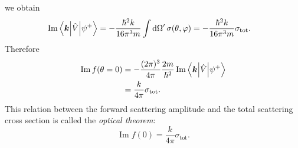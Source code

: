 we obtain
\begin{equation}\begin{aligned}
\operatorname{Im}\left\langle\bm{k}\middle|\hat{V}\middle|\psi^+\right\rangle
&=-\frac{\hbar^2k}{16\pi^3m}\int\mathrm{d}\Omega'\,\sigma(\theta,\varphi)
=-\frac{\hbar^2k}{16\pi^3m}\sigma_{\mathrm{tot}}.
\end{aligned}\end{equation}
Therefore
\begin{equation}\begin{aligned}
\operatorname{Im}f(\theta=0)
&=-\frac{(2\pi)^3}{4\pi}\frac{2m}{\hbar^2}
\operatorname{Im}\left\langle\bm{k}\middle|\hat{V}\middle|\psi^+\right\rangle\\
&=\frac{k}{4\pi}\sigma_{\mathrm{tot}}.
\end{aligned}\end{equation}
This relation between the forward scattering amplitude and the total scattering cross section is called the \emph{optical theorem}:
\begin{equation}
\boxed{\operatorname{Im}f(0)=\frac{k}{4\pi}\sigma_{\mathrm{tot}}}.
\end{equation}